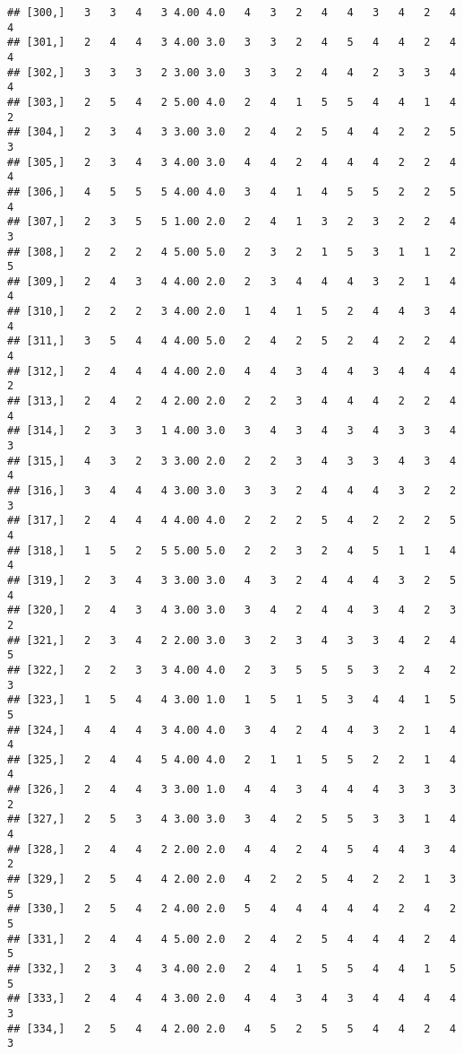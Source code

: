\documentclass[]{article}
\begin{document}
\begin{verbatim}
## [300,]   3   3   4   3 4.00 4.0   4   3   2   4   4   3   4   2   4   4
## [301,]   2   4   4   3 4.00 3.0   3   3   2   4   5   4   4   2   4   4
## [302,]   3   3   3   2 3.00 3.0   3   3   2   4   4   2   3   3   4   4
## [303,]   2   5   4   2 5.00 4.0   2   4   1   5   5   4   4   1   4   2
## [304,]   2   3   4   3 3.00 3.0   2   4   2   5   4   4   2   2   5   3
## [305,]   2   3   4   3 4.00 3.0   4   4   2   4   4   4   2   2   4   4
## [306,]   4   5   5   5 4.00 4.0   3   4   1   4   5   5   2   2   5   4
## [307,]   2   3   5   5 1.00 2.0   2   4   1   3   2   3   2   2   4   3
## [308,]   2   2   2   4 5.00 5.0   2   3   2   1   5   3   1   1   2   5
## [309,]   2   4   3   4 4.00 2.0   2   3   4   4   4   3   2   1   4   4
## [310,]   2   2   2   3 4.00 2.0   1   4   1   5   2   4   4   3   4   4
## [311,]   3   5   4   4 4.00 5.0   2   4   2   5   2   4   2   2   4   4
## [312,]   2   4   4   4 4.00 2.0   4   4   3   4   4   3   4   4   4   2
## [313,]   2   4   2   4 2.00 2.0   2   2   3   4   4   4   2   2   4   4
## [314,]   2   3   3   1 4.00 3.0   3   4   3   4   3   4   3   3   4   3
## [315,]   4   3   2   3 3.00 2.0   2   2   3   4   3   3   4   3   4   4
## [316,]   3   4   4   4 3.00 3.0   3   3   2   4   4   4   3   2   2   3
## [317,]   2   4   4   4 4.00 4.0   2   2   2   5   4   2   2   2   5   4
## [318,]   1   5   2   5 5.00 5.0   2   2   3   2   4   5   1   1   4   4
## [319,]   2   3   4   3 3.00 3.0   4   3   2   4   4   4   3   2   5   4
## [320,]   2   4   3   4 3.00 3.0   3   4   2   4   4   3   4   2   3   2
## [321,]   2   3   4   2 2.00 3.0   3   2   3   4   3   3   4   2   4   5
## [322,]   2   2   3   3 4.00 4.0   2   3   5   5   5   3   2   4   2   3
## [323,]   1   5   4   4 3.00 1.0   1   5   1   5   3   4   4   1   5   5
## [324,]   4   4   4   3 4.00 4.0   3   4   2   4   4   3   2   1   4   4
## [325,]   2   4   4   5 4.00 4.0   2   1   1   5   5   2   2   1   4   4
## [326,]   2   4   4   3 3.00 1.0   4   4   3   4   4   4   3   3   3   2
## [327,]   2   5   3   4 3.00 3.0   3   4   2   5   5   3   3   1   4   4
## [328,]   2   4   4   2 2.00 2.0   4   4   2   4   5   4   4   3   4   2
## [329,]   2   5   4   4 2.00 2.0   4   2   2   5   4   2   2   1   3   5
## [330,]   2   5   4   2 4.00 2.0   5   4   4   4   4   4   2   4   2   5
## [331,]   2   4   4   4 5.00 2.0   2   4   2   5   4   4   4   2   4   5
## [332,]   2   3   4   3 4.00 2.0   2   4   1   5   5   4   4   1   5   5
## [333,]   2   4   4   4 3.00 2.0   4   4   3   4   3   4   4   4   4   3
## [334,]   2   5   4   4 2.00 2.0   4   5   2   5   5   4   4   2   4   3

\end{verbatim}
\end{document}
